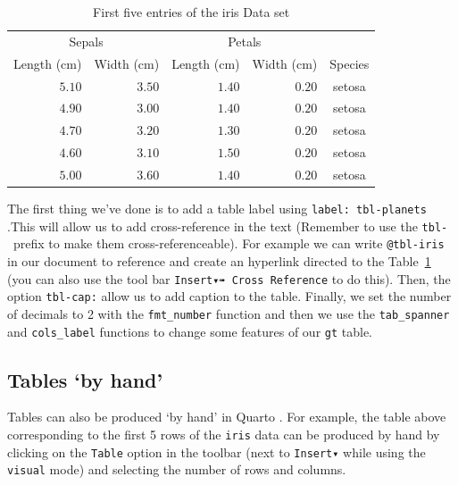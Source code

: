 \documentclass[
  letterpaper,
  DIV=11,
  numbers=noendperiod]{scrartcl}
\begin{document}
\hypertarget{tbl-iris}{}
\begin{longtable}{rrrrc}
\caption{\label{tbl-iris}First five entries of the iris Data set }\tabularnewline

\toprule
\multicolumn{2}{c}{Sepals} & \multicolumn{2}{c}{Petals} &  \\ 
\cmidrule(lr){1-2} \cmidrule(lr){3-4}
Length (cm) & Width (cm) & Length (cm) & Width (cm) & Species \\ 
\midrule\addlinespace[2.5pt]
$5.10$ & $3.50$ & $1.40$ & $0.20$ & setosa \\ 
$4.90$ & $3.00$ & $1.40$ & $0.20$ & setosa \\ 
$4.70$ & $3.20$ & $1.30$ & $0.20$ & setosa \\ 
$4.60$ & $3.10$ & $1.50$ & $0.20$ & setosa \\ 
$5.00$ & $3.60$ & $1.40$ & $0.20$ & setosa \\ 
\bottomrule
\end{longtable}

The first thing we've done is to add a table label using
\texttt{label:\ tbl-planets} .This will allow us to add cross-reference
in the text (Remember to use the \texttt{tbl-}~prefix to make them
cross-referenceable). For example we can write \texttt{@tbl-iris} in our
document to reference and create an hyperlink directed to the
Table~\ref{tbl-iris} (you can also use the tool bar
\texttt{Insert▾➠\ Cross\ Reference} to do this). Then, the option
\texttt{tbl-cap:} allow us to add caption to the table. Finally, we set
the number of decimals to 2 with the \texttt{fmt\_number} function and
then we use the \texttt{tab\_spanner} and \texttt{cols\_label} functions
to change some features of our \texttt{gt} table.

\hypertarget{tables-by-hand}{%
\subsection{Tables `by hand'}\label{tables-by-hand}}

Tables can also be produced `by hand' in Quarto . For example, the table
above corresponding to the first 5 rows of the \texttt{iris} data can be
produced by hand by clicking on the \texttt{Table} option in the toolbar
(next to \texttt{Insert▾} while using the \texttt{visual} mode) and
selecting the number of rows and columns.
\end{document}
